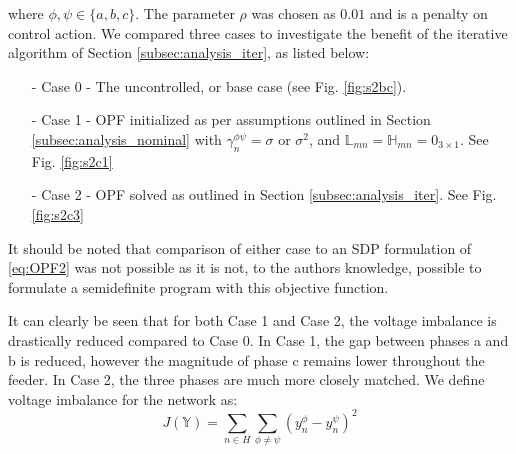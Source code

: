 \noindent where $\phi,\psi \in \{ a,b,c\}$. The parameter $\rho$ was chosen as $0.01$ and is a penalty on control action. We compared three cases to investigate the benefit of the iterative algorithm of Section \ref{subsec:analysis_iter}, as listed below:
\begin{itemize}
	\item[-] Case 0 - The uncontrolled, or base case (see Fig. \ref{fig:s2bc}).
	\item[-] Case 1 - OPF initialized as per assumptions outlined in Section \ref{subsec:analysis_nominal} with $\gamma_{n}^{\phi \psi} = \sigma \text{ or } \sigma^{2}$, and $\mathbb{L}_{mn} = \mathbb{H}_{mn}  = 0_{3 \times 1}$. See Fig. \ref{fig:s2c1}
    \item[-] Case 2 - OPF solved as outlined in Section \ref{subsec:analysis_iter}.  See Fig. \ref{fig:s2c3}
\end{itemize}


It should be noted that comparison of either case to an SDP formulation of \eqref{eq:OPF2} was not possible as it is not, to the authors knowledge, possible to formulate a semidefinite program with this objective function.

It can clearly be seen that for both Case 1 and Case 2, the voltage imbalance is drastically reduced compared to Case 0. In Case 1, the gap between phases a and b is reduced, however the magnitude of phase c remains lower throughout the feeder. In Case 2, the three phases are much more closely matched. We define voltage imbalance for the network as:
\begin{equation}
	J (\mathbb{Y}) = 
    \sum_{n \in H} \sum_{\phi \neq \psi} ( y_{n}^{\phi} - y_{n}^{\psi} )^{2}
    \label{eq:JV}
\end{equation}

